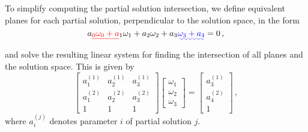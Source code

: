 \documentclass[letterpaper, 10 pt, conference]{ieeeconf}  %
\providecommand{\DIFadd}[1]{{\protect\color{blue}\uwave{#1}}} %
\providecommand{\DIFdel}[1]{{\protect\color{red}\sout{#1}}}                      %
\providecommand{\DIFaddbegin}{} %
\providecommand{\DIFaddend}{} %
\providecommand{\DIFdelbegin}{} %
\providecommand{\DIFdelend}{} %
\begin{document}
To simplify computing the partial solution intersection, we define equivalent planes for each partial solution, perpendicular to the solution space, in the form
\begin{equation}
   a\DIFdelbegin \DIFdel{_0\omega_0 + a}\DIFdelend _1\omega_1 + a_2\omega_2 +a_3\DIFaddbegin \DIFadd{\omega_3 + a_4 }\DIFaddend = 0\,, \label{eqn:3sen_plane_eq}
\end{equation}
and solve the resulting linear system for finding the intersection of all planes and the solution space. This is given by
\begin{equation}
   \DIFdelbegin %
\DIFdelend \DIFaddbegin \begin{bmatrix}
      a_1^{(1)} & a_2^{(1)} & a_3^{(1)} \\
      a_1^{(2)} & a_2^{(2)} & a_3^{(2)} \\
      1 & 1 & 1
   \end{bmatrix}\DIFaddend 
   \DIFdelbegin %
\DIFdelend \DIFaddbegin \begin{bmatrix}
      \omega_1 \\
      \omega_2 \\
      \omega_3
   \end{bmatrix}\DIFaddend 
   =
   \DIFdelbegin %
\DIFdelend \DIFaddbegin \begin{bmatrix}
      a_3^{(1)} \\
      a_4^{(2)} \\
      1
   \end{bmatrix}\DIFaddend \,, \label{eqn:3sen_plane_sol_eq}
\end{equation}
where $a_i^{(j)}$ denotes parameter $i$ of partial solution $j$.
\end{document}
